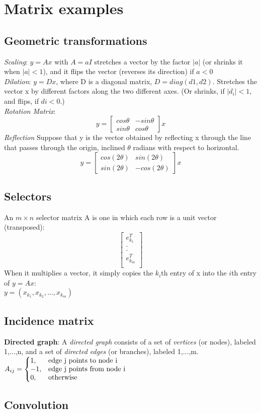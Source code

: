 \section{Matrix examples}
\subsection{Geometric transformations}
\textbullet \textit{Scaling}: $y = Ax$ with $A = aI$ stretches a vector by the factor $|a|$ (or shrinks it when $|a| < 1$), and it flips the vector (reverses its direction) if $a < 0$\\
\textbullet \textit{Dilation}: $y = Dx$, where D is a diagonal matrix, $D = diag(d1,d2)$. Stretches the vector x by different factors along the two different axes. (Or shrinks, if $|d_i| < 1$, and flips, if $di < 0$.)\\
\textbullet \textit{Rotation Matrix}: 
\[
y = 
\begin{bmatrix}
    cos \theta & -sin \theta \\
    sin \theta & cos \theta
\end{bmatrix}x
\]
\textbullet \textit{Reflection}
Suppose that y is the vector obtained by reflecting x through the line that passes through the origin, inclined $\theta$ radians with respect to horizontal.
\[
y = 
\begin{bmatrix}
    cos (2\theta) & sin(2\theta) \\
    sin (2\theta) & -cos (2\theta)
\end{bmatrix}x
\]
\subsection{Selectors}
An $m \times n$ selector matrix A is one in which each row is a unit vector (transposed):
\[
\begin{bmatrix}
    e^T_{k_1}\\
    .\\
    .\\
    e^T_{k_m}\\
\end{bmatrix}
\]
When it multiplies a vector, it simply copies the $k_i$th entry of x into the $i$th entry of $y = Ax$:\\
$y = (x_{k_1},x_{k_2},...,x_{k_m})$

\subsection{Incidence matrix}
\textbf{Directed graph}: A \textit{directed graph} consists of a set of \textit{vertices} (or nodes), labeled 1,...,n, and a set of \textit{directed edges} (or branches), labeled 1,...,m. \\
$
A_{ij} = \left\{
  \begin{array}{@{}ll@{}}
    1, & \text{edge j points to node i} \\
    -1, & \text{edge j points from node i}\\
    0, & \text{otherwise}
  \end{array}\right.
$\\
\subsection{Convolution}
